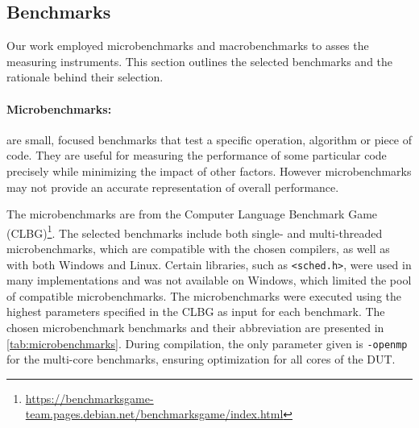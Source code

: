 \subsection{Benchmarks}\label{subsec:test_cases}

Our work employed microbenchmarks and macrobenchmarks to asses the measuring instruments. This section outlines the selected benchmarks and the rationale behind their selection.

\paragraph{Microbenchmarks:} are small, focused benchmarks that test a specific operation, algorithm or piece of code. They are useful for measuring the performance of some particular code precisely while minimizing the impact of other factors. However microbenchmarks may not provide an accurate representation of overall performance.\cite{MicroVSMacro}

The microbenchmarks are from the Computer Language Benchmark Game (CLBG)\footnote{\url{https://benchmarksgame-team.pages.debian.net/benchmarksgame/index.html}}. The selected benchmarks include both single- and multi-threaded microbenchmarks, which are compatible with the chosen compilers, as well as with both Windows and Linux. Certain libraries, such as \texttt{<sched.h>}, were used in many implementations and was not available on Windows, which limited the pool of compatible microbenchmarks. The microbenchmarks were executed using the highest parameters specified in the CLBG as input for each benchmark. The chosen microbenchmark benchmarks and their abbreviation are presented in \cref{tab:microbenchmarks}. During compilation, the only parameter given is \texttt{-openmp} for the multi-core benchmarks, ensuring optimization for all cores of the DUT.



